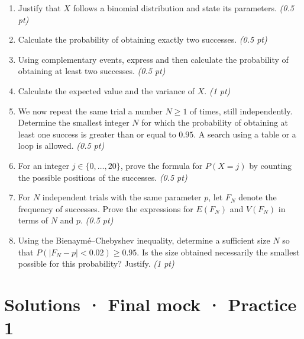 \begin{enumerate}

\item Justify that $X$ follows a binomial distribution and state its parameters. \hfill\textit{(0.5 pt)}

\item Calculate the probability of obtaining exactly two successes. \hfill\textit{(0.5 pt)}

\item Using complementary events, express and then calculate the probability of obtaining at least two successes. \hfill\textit{(0.5 pt)}

\item Calculate the expected value and the variance of $X$. \hfill\textit{(1 pt)}

\item We now repeat the same trial a number $N\ge1$ of times, still independently. Determine the smallest integer $N$ for which the probability of obtaining at least one success is greater than or equal to $0.95$. A search using a table or a loop is allowed. \hfill\textit{(0.5 pt)}

\item For an integer $j\in\{0,\ldots,20\}$, prove the formula for $P(X=j)$ by counting the possible positions of the successes. \hfill\textit{(0.5 pt)}

\item For $N$ independent trials with the same parameter $p$, let $F_N$ denote the frequency of successes. Prove the expressions for $E(F_N)$ and $V(F_N)$ in terms of $N$ and $p$. \hfill\textit{(0.5 pt)}

\item Using the Bienaymé–Chebyshev inequality, determine a sufficient size $N$ so that $P(|F_N-p|<0.02)\ge0.95$. Is the size obtained necessarily the smallest possible for this probability? Justify. \hfill\textit{(1 pt)}

\end{enumerate}

\ifprof\clearpage

\section*{Solutions · Final mock · Practice 1}\label{cor:9-1}

